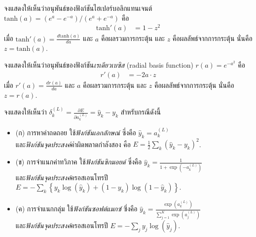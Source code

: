 \begin{Exercise}
	\label{ex: ann tanh derivative}
	
	
	จงแสดงให้เห็นว่าอนุพันธ์ของฟังก์ชันไฮเปอร์บอลิกแทนเจนต์ $\mathrm{tanh}(a) = (e^a - e^{-a})/(e^a + e^{-a})$ คือ
	\begin{align}
	\mathrm{tanh}'(a) &
	= 1 - z^2
	\label{eq: ann dtanh}
	\end{align}
	เมื่อ 
	$\mathrm{tanh}'(a) = \frac{d \mathrm{tanh}(a)}{d a}$
	และ
	$a$ คือผลรวมการกระตุ้น
	และ $z$ คือผลลัพธ์จากการกระตุ้น นั่นคือ $z = \mathrm{tanh}(a)$.
	
\end{Exercise}

\begin{Exercise}
\label{ex: ann radial basis derivative}
	
	จงแสดงให้เห็นว่าอนุพันธ์ของฟังก์ชัน\textit{เรเดียวเบซิส} (radial basis function) 
	$r(a) = e^{-a^2}$
	คือ
	\begin{align}
	r'(a) &
	= -2 a \cdot z
	\label{eq: ann dradial}
	\end{align}
	เมื่อ 
$r'(a) = \frac{d r(a)}{d a}$
และ
$a$ คือผลรวมการกระตุ้น
และ $z$ คือผลลัพธ์จากการกระตุ้น นั่นคือ $z = r(a)$.		
\end{Exercise}

\begin{Exercise}
\label{ex: ann classification derivative}

จงแสดงให้เห็นว่า $\delta_k^{(L)} = \frac{\partial E}{\partial a_k^{(L)}} = \hat{y}_k - y_k$
สำหรับกรณีดังนี้
\begin{itemize}
	\item (ก) การหาค่าถดถอย ใช้\textit{ฟังก์ชันเอกลักษณ์} ซึ่งคือ $\hat{y}_k = a^{(L)}_k$\\ และ\textit{ฟังก์ชันจุดประสงค์}ค่าผิดพลาดกำลังสอง คือ $E = \frac{1}{2} \sum_k (\hat{y}_k - y_k)^2$.
	\item (ข) การจำแนกค่าทวิภาค
	ใช้\textit{ฟังก์ชันซิกมอยด์} ซึ่งคือ $\hat{y}_k = \frac{1}{1 + \exp(-a^{(L)}_k)}$\\ และ\textit{ฟังก์ชันจุดประสงค์}ครอสเอนโทรปี $E = - \sum_k \left\{ y_k \log (\hat{y}_k) + (1-y_k) \log (1-\hat{y}_k) \right\}$.
	\item (ค) การจำแนกกลุ่ม ใช้\textit{ฟังก์ชันซอฟต์แมกซ์} ซึ่งคือ $\hat{y}_k = \frac{\exp(a^{(L)}_k)}{\sum_{j=1}^K \exp(a^{(L)}_j)}$ \\
	และ\textit{ฟังก์ชันจุดประสงค์}ครอสเอนโทรปี $E = - \sum_j y_j \log (\hat{y}_j)$.
\end{itemize}

\end{Exercise}


